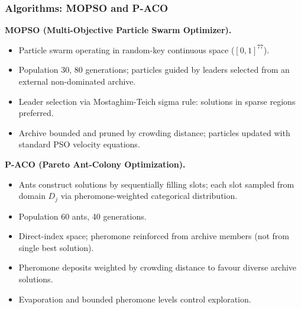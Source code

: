 \documentclass[aspectratio=169,10pt]{beamer}
\begin{document}
\begin{frame}
\frametitle{Algorithms: MOPSO and P-ACO}

\textbf{MOPSO (Multi-Objective Particle Swarm Optimizer).}
\begin{itemize}
  \item Particle swarm operating in random-key continuous space ($[0,1]^{77}$).
  \item Population 30, 80 generations; particles guided by leaders selected from an external non-dominated archive.
  \item Leader selection via Mostaghim-Teich sigma rule: solutions in sparse regions preferred.
  \item Archive bounded and pruned by crowding distance; particles updated with standard PSO velocity equations.
\end{itemize}

\vspace{0.3cm}

\textbf{P-ACO (Pareto Ant-Colony Optimization).}
\begin{itemize}
  \item Ants construct solutions by sequentially filling slots; each slot sampled from domain $D_j$ via pheromone-weighted categorical distribution.
  \item Population 60 ants, 40 generations.
  \item Direct-index space; pheromone reinforced from archive members (not from single best solution).
  \item Pheromone deposits weighted by crowding distance to favour diverse archive solutions.
  \item Evaporation and bounded pheromone levels control exploration.
\end{itemize}

\end{frame}
\end{document}
